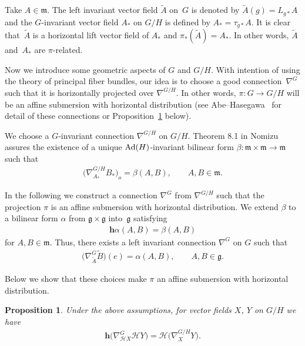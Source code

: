 \documentclass[10pt,a4paper]{amsart}
\numberwithin{equation}{section}
\newtheorem{Proposition}[Theorem]{Proposition}
{ \theoremstyle{definition}
\newtheorem{Definition}[Theorem]{Definition}
\newtheorem{Example}[Theorem]{Example}
\newtheorem{Remark}[Theorem]{Remark}}
\newcommand{\g}{\mathfrak{g}}
\newcommand{\m}{\mathfrak{m}}
\begin{document}
Take $A \in \m$. The left invariant vector f\/ield $\tilde{A}$ on~$G$ is denoted by $\tilde{A}(g) = L_{g*}A$ and the $G$-invariant vector f\/ield $A_{*}$ on $G/H$ is def\/ined by $A_{*} =\tau_{g*}A$. It is clear that~$\tilde{A}$ is a horizontal lift vector f\/ield of $A_{*}$ and $\pi_*(\tilde{A})= A_*$. In other words, $\tilde{A}$ and~$A_{*}$ are $\pi$-related.

Now we introduce  some geometric aspects of $G$ and $G/H$. With
intention of using the theory of principal f\/iber bundles, our idea
is to choose a good connection~$\nabla^{G}$ such that it is
horizontally  projected over $\nabla^{G/H}$. In other words, $\pi\colon G
\rightarrow G/H$ will be an af\/f\/ine submersion with horizontal
distribution (see Abe--Hasegawa~\cite{AbeN/HasewagaK} for detail of
these connections or Proposition~\ref{propconn1} below).

We choose a $G$-invariant connection $\nabla^{G/H}$ on $G/H$.
Theorem 8.1 in Nomizu \cite{Nomizu} assures the existence of a
unique ${\rm Ad}(H)$-invariant bilinear form $\beta\colon  \m \times \m
\rightarrow \m$ such that
\begin{gather*}
  \big(\nabla^{G/H}_{A_*}B_*\big)_{o} = \beta(A,B), \qquad A, B \in \m.
\end{gather*}

In the following we construct a connection $\nabla^{G}$ from $\nabla^{G/H}$ such that the projection $\pi$ is an af\/f\/ine submersion with horizontal distribution. We extend $\beta$ to a bilinear form $\alpha$ from $\g \times \g$ into~$\g$ satisfying
\begin{gather}\label{alphabetaconnection}
  \mathbf{h}\alpha(A,B) = \beta(A,B)
\end{gather}
for $A,B \in \m$. Thus, there exists a left invariant connection $\nabla^{G}$ on $G$ such that
\begin{gather*}
  \big(\nabla^{G}_{\tilde{A}}\tilde{B}\big)(e) = \alpha(A,B), \qquad A,B \in \g.
\end{gather*}

Below we show that these choices make $\pi$ an af\/f\/ine submersion with horizontal distribution.

\begin{Proposition}\label{propconn1}
  Under the above assumptions, for vector fields $X$, $Y$ on $G/H$ we have
  \begin{gather*}
    \mathbf{h}\big(\nabla^{G}_{\mathcal{H}X}\mathcal{H}Y\big) = \mathcal{H}\big(\nabla^{G/H}_{X}Y\big).
  \end{gather*}
\end{Proposition}
\end{document}

